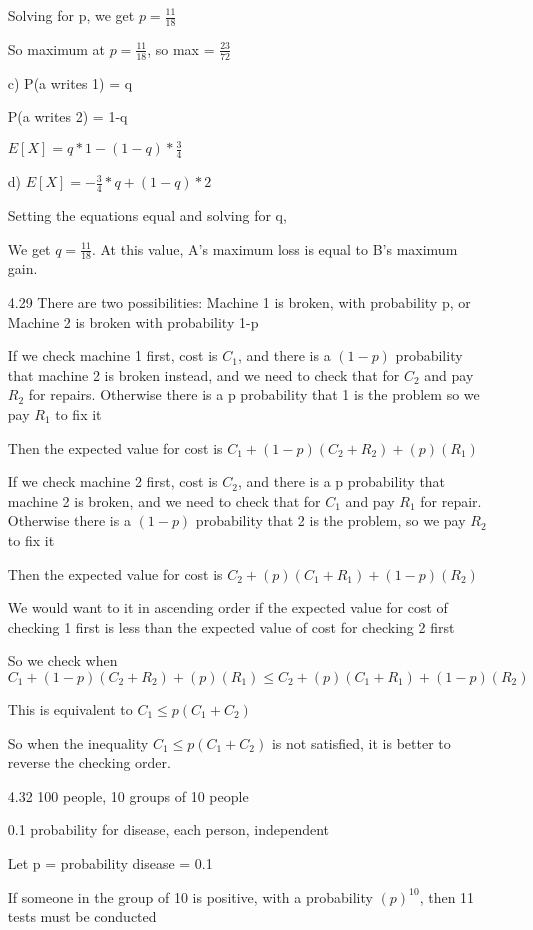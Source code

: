 \documentclass[11pt]{article}
\begin{document}
\begin{itemize}
  Solving for p, we get $p = \frac{11}{18}$

  So maximum at $p = \frac{11}{18}$, so max = $\frac{23}{72}$

  c) P(a writes 1) = q

  P(a writes 2) = 1-q

  $E[X] = q*1 - (1-q)*\frac{3}{4}$

  d) $E[X] = -\frac{3}{4}*q + (1-q)*2$

  Setting the equations equal and solving for q,

  We get $q = \frac{11}{18}$. At this value, A's maximum loss is equal to B's maximum gain.
\item[4.29]
  There are two possibilities: Machine 1 is broken, with probability p, or Machine 2 is broken with probability 1-p

  If we check machine 1 first, cost is $C_1$, and there is a $(1-p)$ probability that machine 2 is broken instead, and we need to check that for $C_2$ and pay $R_2$ for repairs. Otherwise there is a p probability that 1 is the problem so we pay $R_1$ to fix it

  Then the expected value for cost is $C_1 + (1-p)(C_2 + R_2) + (p)(R_1)$

  If we check machine 2 first, cost is $C_2$, and there is a p probability that machine 2 is broken, and we need to check that for $C_1$ and pay $R_1$ for repair. Otherwise there is a $(1-p)$ probability that 2 is the problem, so we pay $R_2$ to fix it

  Then the expected value for cost is $C_2 + (p)(C_1 + R_1) + (1-p)(R_2)$

  We would want to it in ascending order if the expected value for cost of checking 1 first is less than the expected value of cost for checking 2 first

  So we check when $C_1 + (1-p)(C_2 + R_2) + (p)(R_1) \leq C_2 + (p)(C_1 + R_1) + (1-p)(R_2)$

  This is equivalent to $C_1 \leq p(C_1 + C_2)$

  So when the inequality $C_1 \leq p(C_1 + C_2)$ is not satisfied, it is better to reverse the checking order.
\item[4.32]
  100 people, 10 groups of 10 people

  0.1 probability for disease, each person, independent

  Let p = probability disease = 0.1

  If someone in the group of 10 is positive, with a probability $(p)^{10}$, then 11 tests must be conducted


\end{itemize}
\end{document}
